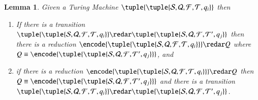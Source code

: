 \documentclass[submission,copyright,creativecommons]{eptcs}
\newtheorem{lemma}[theorem]{Lemma}
\newcommand{\tmach}[1]{\tuple{\tuple{#1}}}
\begin{document}
\begin{lemma}
\label{lem:fin:faithful}
Given a Turing Machine $\tmach{{\mathcal S}, {\mathcal Q}, {\mathcal F}, {\mathcal T}, q_i}$
then
\begin{enumerate}
\item If there is a transition
$\tmach{{\mathcal S}, {\mathcal Q}, {\mathcal F}, {\mathcal T}, q_i}\redar
\tmach{{\mathcal S}, {\mathcal Q}, {\mathcal F}, {\mathcal T}', q_j}$
then there is a reduction
$\encode{\tmach{{\mathcal S}, {\mathcal Q}, {\mathcal F}, {\mathcal T}, q_i}}\redar Q$
where $Q\equiv\encode{\tmach{{\mathcal S}, {\mathcal Q}, {\mathcal F}, {\mathcal T}', q_j}}$, and
\item if there is a reduction
$\encode{\tmach{{\mathcal S}, {\mathcal Q}, {\mathcal F}, {\mathcal T}, q_i}}\redar Q$
then $Q\equiv\encode{\tmach{{\mathcal S}, {\mathcal Q}, {\mathcal F}, {\mathcal T}', q_j}}$ and
there is a transition
$\tmach{{\mathcal S}, {\mathcal Q}, {\mathcal F}, {\mathcal T}, q_i}\redar
\tmach{{\mathcal S}, {\mathcal Q}, {\mathcal F}, {\mathcal T}', q_j}$.
\end{enumerate}
\end{lemma}
\end{document}

